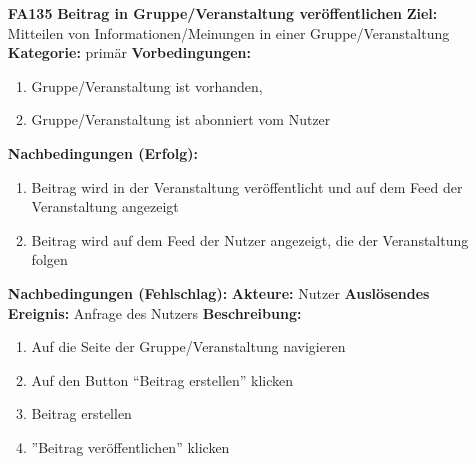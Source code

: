 \documentclass[parskip=full]{scrartcl}
\begin{document}
\begin{itemize}[nosep]
			\item[\textbf{FA135}]\textbf{Beitrag in Gruppe/Veranstaltung veröffentlichen}
			\newline \textbf{Ziel:} Mitteilen von Informationen/Meinungen in einer Gruppe/Veranstaltung
			\newline \textbf{Kategorie:} primär
			\newline \textbf{Vorbedingungen:}
			\begin{enumerate}[nosep]
				\item Gruppe/Veranstaltung ist vorhanden,
				\item Gruppe/Veranstaltung ist abonniert vom Nutzer
			\end{enumerate}
			\textbf{Nachbedingungen (Erfolg):}
			\begin{enumerate}[nosep]
				\item Beitrag wird in der Veranstaltung veröffentlicht und auf dem \gls{Feed} der Veranstaltung angezeigt
				\item Beitrag wird auf dem \gls{Feed} der Nutzer angezeigt, die der Veranstaltung folgen
			\end{enumerate}
			\textbf{Nachbedingungen (Fehlschlag):}
			\newline \textbf{Akteure:} Nutzer
			\newline \textbf{Auslösendes Ereignis:} Anfrage des Nutzers
			\newline \textbf{Beschreibung:}
			\begin{enumerate}[nosep]
				\item Auf die Seite der Gruppe/Veranstaltung navigieren
				\item Auf den Button “Beitrag erstellen” klicken
				\item Beitrag erstellen
				\item ”Beitrag veröffentlichen” klicken\\
			\end{enumerate}
			

\end{itemize}
\end{document}
